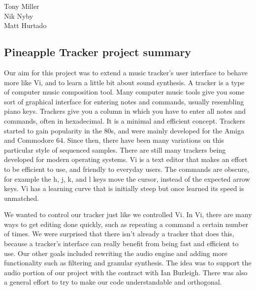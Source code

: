\documentclass[12pt,letterpaper]{article}
\begin{document}
\begin{flushright}
Tony Miller\\
Nik Nyby\\
Matt Hurtado
\end{flushright}

\begin{center}
\section*{Pineapple Tracker project summary}
\end{center}


\doublespacing
\par
Our aim for this project was to extend a music tracker's user interface to behave more like Vi, and to learn a little bit about sound synthesis. A tracker is a type of computer music composition tool. Many computer music tools give you some sort of graphical interface for entering notes and commands, usually resembling piano keys. Trackers give you a column in which you have to enter all notes and commands, often in hexadecimal. It is a minimal and efficient concept. Trackers started to gain popularity in the 80s, and were mainly developed for the Amiga and Commodore 64. Since then, there have been many variations on this particular style of sequenced samples. There are still many trackers being developed for modern operating systems. Vi is a text editor that makes an effort to be efficient to use, and friendly to everyday users. The commands are obscure, for example the h, j, k, and l keys move the cursor, instead of the expected arrow keys. Vi has a learning curve that is initially steep but once learned its speed is unmatched.

\par
We wanted to control our tracker just like we controlled Vi. In Vi, there are many ways to get editing done quickly, such as repeating a command a certain number of times. We were surprised that there isn't already a tracker that does this, because a tracker's interface can really benefit from being fast and efficient to use. Our other goals included rewriting the audio engine and adding more functionality such as filtering and granular synthesis. The idea was to support the audio portion of our project with the contract with Ian Burleigh. There was also a general effort to try to make our code understandable and orthogonal.
\end{document}
